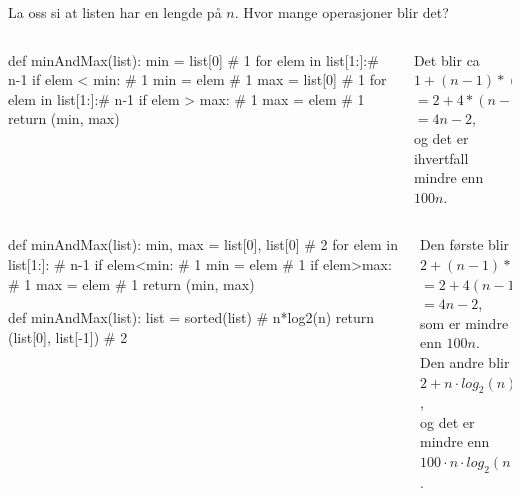 \begin{frame}[fragile]{}
    La oss si at listen har en lengde på $n$. Hvor mange operasjoner blir det?
    \begin{columns}
        \begin{column}{0.45\textwidth}
            \begin{python}
def minAndMax(list):
    min = list[0]        # 1
    for elem in list[1:]:# n-1
        if elem < min:   # 1
            min = elem   # 1
    max = list[0]        # 1
    for elem in list[1:]:# n-1
        if elem > max:   # 1
            max = elem   # 1
    return (min, max)
            \end{python}
        \end{column}
        \pause
        \begin{column}{0.45\textwidth}
            Det blir ca\\
            $1 + (n-1)*(1+1) + 1 + (n-1)*(1+1)$\\
            $= 2 + 4*(n-1) $\\
            $= 4n-2$,\\
            og det er ihvertfall mindre enn \underline{$100n$}.
        \end{column}
    \end{columns}
\end{frame}

\begin{frame}[fragile]{}
    \begin{columns}
        \begin{column}{0.55\textwidth}
            \begin{python}
def minAndMax(list):              
    min, max = list[0], list[0] # 2
    for elem in list[1:]:       # n-1
        if elem<min:            # 1
            min = elem          # 1
        if elem>max:            # 1
            max = elem          # 1
    return (min, max)
    
def minAndMax(list):
    list = sorted(list)   # n*log2(n)
    return (list[0], list[-1]) # 2
            \end{python}
        \end{column}
        \pause
        \begin{column}{0.42\textwidth}
            Den første blir $2+(n-1)*(2+2)$\\
            $= 2+4(n-1)$\\
            $= 4n-2$,\\
            som er mindre enn \underline{$100n$}.\\[3mm]
            \pause
            Den andre blir\\
            $2 + n \cdot log_2(n)$,\\ 
            og det er mindre enn \underline{$100 \cdot n \cdot log_2(n)$}.
        \end{column}
    \end{columns}
\end{frame}

